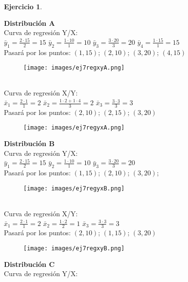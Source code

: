 \documentclass[a4paper, 12pt]{article}
\theoremstyle{definition}
\newtheorem{ej}{Ejercicio}
\begin{document}
\begin{ej}
\begin{enumerate}
        \textbf{Distribución A} \\
        Curva de regresión Y/X: \\
        $\bar{y}_1 = \frac{2 \cdot 15}{2} = 15$  $\bar{y}_2 = \frac{1 \cdot 10}{1} = 10$  $\bar{y}_3 = \frac{3 \cdot 20}{3} = 20$  $\bar{y}_4 = \frac{1 \cdot 15}{1} = 15$ \\
        Pasará por los puntos: $(1,15)$; $(2,10)$; $(3,20)$; $(4,15)$
        \begin{figure} [h]
        	\centering
    	    \texttt{[image: images/ej7regxyA.png]}
        \end{figure} \\
        Curva de regresión X/Y: \\
        $\bar{x}_1 = \frac{2 \cdot 1}{1} = 2$  $\bar{x}_2 = \frac{1 \cdot 2 + 1 \cdot 4}{3} = 2$  $\bar{x}_3 = \frac{3 \cdot 3}{3} = 3$ \\ 
        Pasará por los puntos: $(2,10)$; $(2,15)$; $(3,20)$ \\
        \begin{figure}[h]
        	\centering
    	    \texttt{[image: images/ej7regyxA.png]}
        \end{figure} 
        \textbf{Distribución B} \\
        Curva de regresión Y/X: \\
        $\bar{y}_1 = \frac{2 \cdot 15}{2} = 15$  $\bar{y}_2 = \frac{1 \cdot 10}{1} = 10$  $\bar{y}_3 = \frac{3 \cdot 20}{3} = 20$  \\
        Pasará por los puntos: $(1,15)$; $(2,10)$; $(3,20)$; \\
        \begin{figure}[h]
        	\centering
    	    \texttt{[image: images/ej7regyxB.png]}
        \end{figure} \\
        Curva de regresión X/Y: \\
        $\bar{x}_1 = \frac{2 \cdot 1}{1} = 2$  $\bar{x}_2 = \frac{1 \cdot 2}{2} = 1$  $\bar{x}_3 = \frac{3 \cdot 3}{3} = 3$ \\ 
        Pasará por los puntos: $(2,10)$; $(1,15)$; $(3,20)$ \\
        \begin{figure}[h]
        	\centering
    	    \texttt{[image: images/ej7regxyB.png]}
        \end{figure}
        \newpage
        \textbf{Distribución C} \\
        Curva de regresión Y/X: \\

\end{enumerate}
\end{ej}
\end{document}
